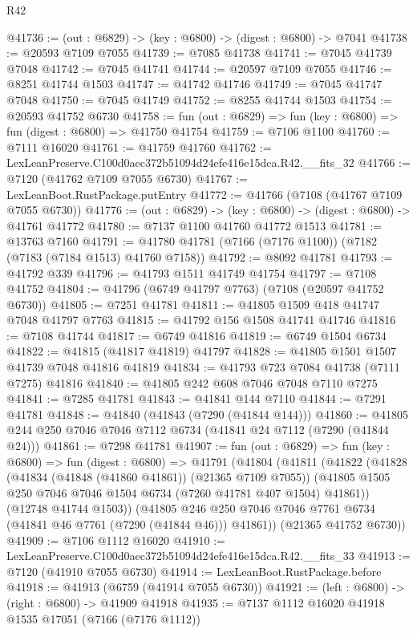 \begin{lexlean}{R42}
\begin{coremodule}
{@41736 := (out : @6829) -> (key : @6800) -> (digest : @6800) -> @7041
@41738 := @20593 @7109 @7055
@41739 := @7085 @41738
@41741 := @7045 @41739 @7048
@41742 := @7045 @41741
@41744 := @20597 @7109 @7055
@41746 := @8251 @41744 @1503
@41747 := @41742 @41746
@41749 := @7045 @41747 @7048
@41750 := @7045 @41749
@41752 := @8255 @41744 @1503
@41754 := @20593 @41752 @6730
@41758 := fun (out : @6829) => fun (key : @6800) => fun (digest : @6800) => @41750 @41754
@41759 := @7106 @1100
@41760 := @7111 @16020
@41761 := @41759 @41760
@41762 := LexLeanPreserve.C100d0aec372b51094d24efe416e15dca.R42.__fits_32
@41766 := @7120 (@41762 @7109 @7055 @6730)
@41767 := LexLeanBoot.RustPackage.putEntry
@41772 := @41766 (@7108 (@41767 @7109 @7055 @6730))
@41776 := (out : @6829) -> (key : @6800) -> (digest : @6800) -> @41761 @41772
@41780 := @7137 @1100 @41760 @41772 @1513
@41781 := @13763 @7160
@41791 := @41780 @41781 (@7166 (@7176 @1100)) (@7182 (@7183 (@7184 @1513) @41760 @7158))
@41792 := @8092 @41781
@41793 := @41792 @339
@41796 := @41793 @1511 @41749 @41754
@41797 := @7108 @41752
@41804 := @41796 (@6749 @41797 @7763) (@7108 (@20597 @41752 @6730))
@41805 := @7251 @41781
@41811 := @41805 @1509 @418 @41747 @7048 @41797 @7763
@41815 := @41792 @156 @1508 @41741 @41746
@41816 := @7108 @41744
@41817 := @6749 @41816
@41819 := @6749 @1504 @6734
@41822 := @41815 (@41817 @41819) @41797
@41828 := @41805 @1501 @1507 @41739 @7048 @41816 @41819
@41834 := @41793 @723 @7084 @41738 (@7111 @7275) @41816
@41840 := @41805 @242 @608 @7046 @7048 @7110 @7275
@41841 := @7285 @41781
@41843 := @41841 @144 @7110
@41844 := @7291 @41781
@41848 := @41840 (@41843 (@7290 (@41844 @144)))
@41860 := @41805 @244 @250 @7046 @7046 @7112 @6734 (@41841 @24 @7112 (@7290 (@41844 @24)))
@41861 := @7298 @41781
@41907 := fun (out : @6829) =>
  fun (key : @6800) =>
  fun (digest : @6800) =>
  @41791
    (@41804
      (@41811
        (@41822
          (@41828
            (@41834 (@41848 (@41860 @41861)) (@21365 @7109 @7055))
            (@41805 @1505 @250 @7046 @7046 @1504 @6734 (@7260 @41781 @407 @1504) @41861))
          (@12748 @41744 @1503))
        (@41805 @246 @250 @7046 @7046 @7761 @6734 (@41841 @46 @7761 (@7290 (@41844 @46))) @41861))
      (@21365 @41752 @6730))
@41909 := @7106 @1112 @16020
@41910 := LexLeanPreserve.C100d0aec372b51094d24efe416e15dca.R42.__fits_33
@41913 := @7120 (@41910 @7055 @6730)
@41914 := LexLeanBoot.RustPackage.before
@41918 := @41913 (@6759 (@41914 @7055 @6730))
@41921 := (left : @6800) -> (right : @6800) -> @41909 @41918
@41935 := @7137
    @1112
    @16020
    @41918
    @1535
    @17051
    (@7166 (@7176 @1112))
}
\end{coremodule}
\end{lexlean}
